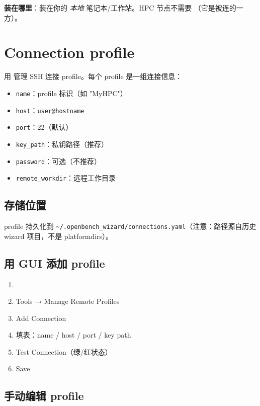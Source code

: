 \textbf{装在哪里}：装在你的 \emph{本地} 笔记本/工作站。HPC 节点不需要 \cli{[remote]}（它是被连的一方）。

\section{Connection profile}

\openbench{} 用  管理 SSH 连接 profile。每个 profile 是一组连接信息：

\begin{itemize}
  \item \texttt{name}：profile 标识（如 "MyHPC"）
  \item \texttt{host}：\texttt{user@hostname}
  \item \texttt{port}：22（默认）
  \item \texttt{key\_path}：私钥路径（推荐）
  \item \texttt{password}：可选（不推荐）
  \item \texttt{remote\_workdir}：远程工作目录
\end{itemize}

\subsection{存储位置}

profile 持久化到 \texttt{\~{}/.openbench\_wizard/connections.yaml}（注意：路径源自历史 wizard 项目，不是 platformdirs）。

\subsection{用 GUI 添加 profile}

\begin{enumerate}
  \item {}
  \item Tools → Manage Remote Profiles
  \item Add Connection
  \item 填表：name / host / port / key path
  \item Test Connection（绿/红状态）
  \item Save
\end{enumerate}

\subsection{手动编辑 profile}

